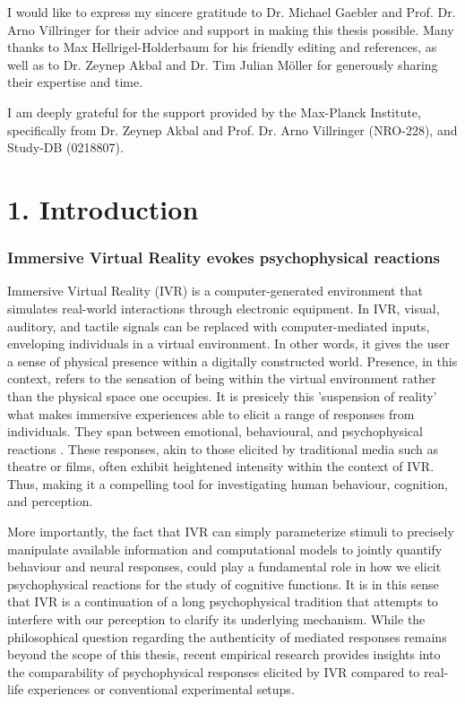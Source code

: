 \documentclass[12pt,oneside,openright]{report}
\begin{document}
\begin{adjustwidth}{1cm}{1cm}

I would like to express my sincere gratitude to Dr. Michael Gaebler and Prof. Dr. Arno Villringer for their advice and support in making this thesis possible. Many thanks to Max Hellrigel-Holderbaum for his friendly editing and references, as well as to Dr. Zeynep Akbal and Dr. Tim Julian Möller for generously sharing their expertise and time.

I am deeply grateful for the support provided by the Max-Planck Institute, specifically from Dr. Zeynep Akbal and Prof. Dr. Arno Villringer (NRO-228), and Study-DB (0218807).
    
\end{adjustwidth}

\clearpage

\section*{1. Introduction}
\subsubsection*{Immersive Virtual Reality evokes psychophysical reactions}

Immersive Virtual Reality (IVR) is a computer-generated environment that simulates real-world interactions through electronic equipment. In IVR, visual, auditory, and tactile signals can be replaced with computer-mediated inputs, enveloping individuals in a virtual environment. In other words, it gives the user a sense of physical presence within a digitally constructed world. Presence, in this context, refers to the sensation of being within the virtual environment rather than the physical space one occupies. It is presicely this 'suspension of reality' what makes immersive experiences able to elicit a range of responses from individuals. They span between emotional, behavioural, and psychophysical reactions \parencite{SanchezVives2005FromPT}. These responses, akin to those elicited by traditional media such as theatre or films, often exhibit heightened intensity within the context of IVR. Thus, making it a compelling tool for investigating human behaviour, cognition, and perception. 

More importantly, the fact that IVR can simply parameterize stimuli to precisely manipulate available information and computational models to jointly quantify behaviour and neural responses, could play a fundamental role in how we elicit psychophysical reactions for the study of cognitive functions\parencite{WASKOM2019100}. It is in this sense that IVR is a continuation of a long psychophysical tradition that attempts to interfere with our perception to clarify its underlying mechanism\parencite{deGelder2018VirtualRA}. While the philosophical question regarding the authenticity of mediated responses remains beyond the scope of this thesis, recent empirical research provides insights into the comparability of psychophysical responses elicited by IVR compared to real-life experiences or conventional experimental setups.
\end{document}
